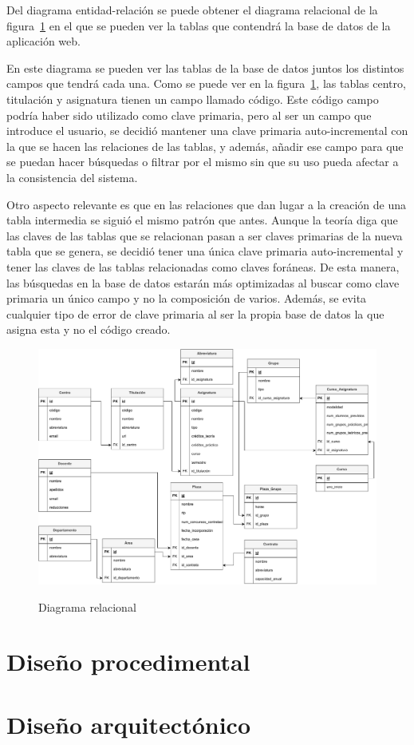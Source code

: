 Del diagrama entidad-relación se puede obtener el diagrama relacional de la figura~\ref{DiagramaRelacional} en el que se pueden ver la tablas que contendrá la base de datos de la aplicación web.

En este diagrama se pueden ver las tablas de la base de datos juntos los distintos campos que tendrá cada una.
Como se puede ver en la figura~\ref{DiagramaRelacional}, las tablas centro, titulación y asignatura tienen un campo llamado código. 
Este código campo podría haber sido utilizado como clave primaria, pero al ser un campo que introduce el usuario, se decidió mantener una clave primaria auto-incremental con la que se hacen las relaciones de las tablas, y además, añadir ese campo para que se puedan hacer búsquedas o filtrar por el mismo sin que su uso pueda afectar a la consistencia del sistema.

Otro aspecto relevante es que en las relaciones que dan lugar a la creación de una tabla intermedia se siguió el mismo patrón que antes. 
Aunque la teoría diga que las claves de las tablas que se relacionan pasan a ser claves primarias de la nueva tabla que se genera, se decidió tener una única clave primaria auto-incremental y tener las claves de las tablas relacionadas como claves foráneas.
De esta manera, las búsquedas en la base de datos estarán más optimizadas al buscar como clave primaria un único campo y no la composición de varios.
Además, se evita cualquier tipo de error de clave primaria al ser la propia base de datos la que asigna esta y no el código creado.

\begin{landscape}
	\begin{figure}[h]
		\caption[DiagramaRelacional]{Diagrama relacional}
		\centering
		\includegraphics[scale=0.7]{../img/Anexos/Diagrama relacional.pdf}
		\label{DiagramaRelacional}
	\end{figure}
\end{landscape}


\section{Diseño procedimental}

\section{Diseño arquitectónico}


